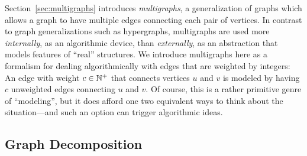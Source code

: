 
Section~\ref{sec:multigraphs} introduces {\it multigraphs}, a generalization of graphs which allows a graph to have multiple edges connecting each pair of vertices.  In contrast to graph generalizations such as hypergraphs, multigraphs are used more {\em internally}, as an algorithmic device, than {\em externally}, as an abstraction that models features of ``real'' structures.  We introduce multigraphs here as a formalism for dealing algorithmically with edges that are weighted by integers: An edge with weight $c \in \mathbb{N}^+$ that connects vertices $u$ and $v$ is modeled by having $c$ unweighted edges connecting $u$ and $v$.  Of course, this is a rather primitive genre of ``modeling'', but it does afford one two equivalent ways to think about the situation---and such an option can trigger algorithmic ideas.



\subsection{Graph Decomposition}
\label{sec:graph-decompose}

